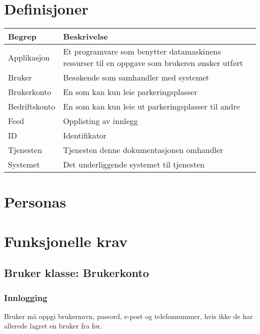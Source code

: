 \documentclass[12pt]{article}
\begin{document}
\section{Definisjoner}

\begin{center}
    \begin{tabular}{|p{4cm}|p{12cm}| } 
        \hline
        \bf Begrep & \bf Beskrivelse \\
        \hline
        Applikasjon &  Et programvare som benytter datamaskinens ressurser til en oppgave som brukeren ønsker utført \\
        \hline
        Bruker & Besøkende som samhandler med systemet \\
        \hline
        Brukerkonto & En som kan kun leie parkeringsplasser \\
        \hline
        Bedriftskonto & En som kan kun leie ut parkeringsplasser til andre \\
        \hline
        Feed & Opplisting av innlegg \\
        \hline
        ID & Identifikator \\
        \hline
        Tjenesten & Tjenesten denne dokumentasjonen omhandler \\
        \hline
        Systemet & Det underliggende systemet til tjenesten \\
        \hline
    \end{tabular}
\end{center}

\section{Personas}

\section{Funksjonelle krav}

    \subsection{Bruker klasse: Brukerkonto}

        \subsubsection{Innlogging}
            Bruker må oppgi brukernavn, passord, e-post og telefonnummer, hvis ikke de har allerede lagret en bruker fra før.
\end{document}
